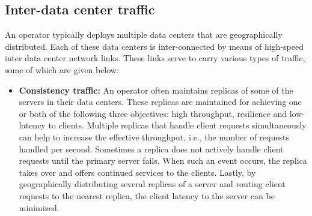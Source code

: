 \subsection{Inter-data center traffic} An operator typically deploys multiple data centers that are geographically distributed. Each of these data centers is inter-connected by means of high-speed inter data center network links. These links serve to carry various types of traffic, some of which are given below:
\begin{itemize}
\item \textbf{Consistency traffic:} An operator often maintains replicas of some of the servers in their data centers. These replicas are maintained for achieving one or both of the following three objectives: high throughput, resilience and low-latency to clients. Multiple replicas that handle client requests simultaneously can help to increase the effective throughput, i.e., the number of requests handled per second. Sometimes a replica does not actively handle client requests until the primary server fails. When such an event occurs, the replica takes over and offers continued services to the clients. Lastly, by geographically distributing several replicas of a server and routing client requests to the nearest replica, the client latency to the server can be minimized. 


\end{itemize}

